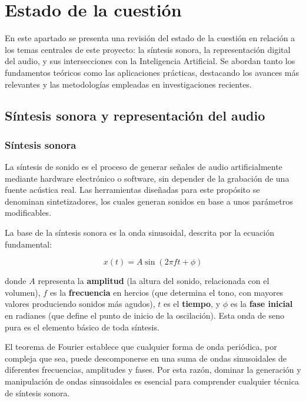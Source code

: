 \chapter{Estado de la cuestión}
\label{cap:estadoDeLaCuestion}

En este apartado se presenta una revisión del estado de la cuestión en relación a los temas centrales de este proyecto: la síntesis sonora, la representación digital del audio, y sus intersecciones con la Inteligencia Artificial. Se abordan tanto los fundamentos teóricos como las aplicaciones prácticas, destacando los avances más relevantes y las metodologías empleadas en investigaciones recientes.

\section {Síntesis sonora y representación del audio}

\subsection{Síntesis sonora}
La síntesis de sonido es el proceso de generar señales de audio artificialmente mediante hardware electrónico o software, sin depender de la grabación de una fuente acústica real. Las herramientas diseñadas para este propósito se denominan sintetizadores, los cuales generan sonidos en base a unos parámetros modificables. 

La base de la síntesis sonora es la onda sinusoidal, descrita por la ecuación fundamental:

\begin{equation}
x(t) = A \sin(2\pi f t + \phi)
\label{eq:sine_wave_synthesis}
\end{equation}

donde $A$ representa la \textbf{amplitud} (la altura del sonido, relacionada con el volumen), $f$ es la \textbf{frecuencia} en hercios (que determina el tono, con mayores valores produciendo sonidos más agudos), $t$ es el \textbf{tiempo}, y $\phi$ es la \textbf{fase inicial} en radianes (que define el punto de inicio de la oscilación). Esta onda de seno pura es el elemento básico de toda síntesis.

El teorema de Fourier establece que cualquier forma de onda periódica, por compleja que sea, puede descomponerse en una suma de ondas sinusoidales de diferentes frecuencias, amplitudes y fases. Por esta razón, dominar la generación y manipulación de ondas sinusoidales es esencial para comprender cualquier técnica de síntesis sonora.

